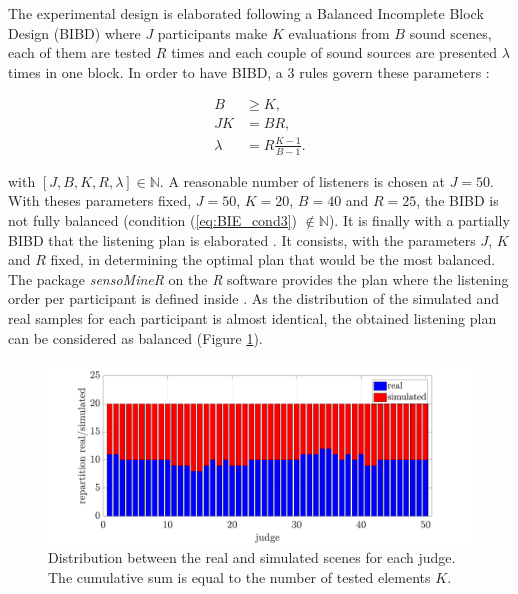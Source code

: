 \documentclass[11pt,letter]{article}
\begin{document}
The experimental design is elaborated following a Balanced Incomplete Block Design (BIBD) \cite{dagnelie_principes_2003} where $J$ participants make $K$ evaluations from $B$ sound scenes, each of them are tested $R$ times and each couple of sound sources are presented $\lambda$ times in one block. In order to have BIBD, a 3 rules govern these parameters :

\begin{subequations}\label{eq:BIE_cond}
\begin{align}
B &\geq K, \label{eq:BIE_cond1}\\
JK &= BR, \label{eq:BIE_cond2}\\
\lambda &= R\frac{K-1}{B-1}. \label{eq:BIE_cond3}
\end{align}
\end{subequations}

with $\left[J, B, K, R, \lambda\right] \in \mathbb{N}$. A reasonable number of listeners is chosen at $J = 50$.  With theses parameters fixed, $J=50$, $K=20$, $B=40$ and $R=25$, the BIBD is not fully balanced (condition (\ref{eq:BIE_cond3}) $\notin \mathbb{N}$). It is finally with a partially BIBD that the listening plan is elaborated \cite{pages_blocs_2007}. It consists, with the parameters $J$, $K$ and $R$ fixed, in determining the optimal plan that would be the most balanced. The package \textit{sensoMineR} on the \textit{R} software provides the plan where the listening order per participant is defined inside \cite{le_sensominer:_2008}. As the distribution of the simulated and real samples for each participant is almost identical, the obtained listening plan can be considered as balanced (Figure \ref{fig:repartition}).\\

\begin{figure}[ht]
\centering
\includegraphics[width = .7\linewidth]{./pictures/repartition-real-simulated.pdf}
\caption{Distribution between the real and simulated scenes for each judge. The cumulative sum is equal to the number of tested elements $K$.}
\label{fig:repartition}
\end{figure}
\end{document}
